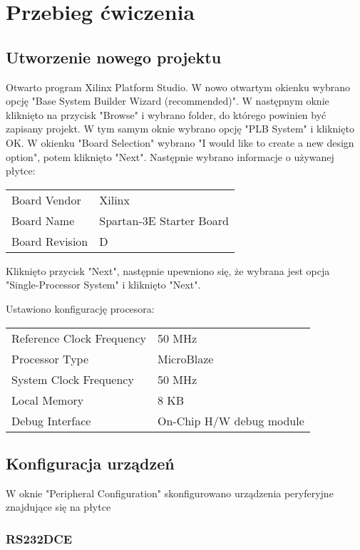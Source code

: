 \section{Przebieg ćwiczenia}
\subsection{Utworzenie nowego projektu}
Otwarto program Xilinx Platform Studio. W nowo otwartym okienku wybrano opcję "Base System
Builder Wizard (recommended)". W następnym oknie kliknięto na
przycisk "Browse" i wybrano folder, do którego powinien być zapisany projekt. W tym samym oknie
wybrano opcję "PLB System" i kliknięto OK.
W okienku "Board Selection" wybrano "I would like to create a new design option", potem kliknięto
"Next". Następnie wybrano informacje o używanej płytce:

\begin{center}
	\begin{tabular}{|l|l|}
		Board Vendor & Xilinx \\
		Board Name & Spartan-3E Starter Board \\
		Board Revision & D
	\end{tabular}
\end{center}
Kliknięto przycisk "Next", następnie upewniono się, że wybrana jest opcja "Single-Processor System"
i kliknięto "Next".

Ustawiono konfigurację procesora:

\begin{center}
	\begin{tabular}{|l|l|}
		Reference Clock Frequency & 50 MHz\\
		Processor Type			& MicroBlaze\\
		System Clock Frequency	& 50 MHz\\
		Local Memory			  & 8 KB\\
		Debug Interface		   & On-Chip H/W debug module\\
	\end{tabular}
\end{center}
\subsection{Konfiguracja urządzeń}

W oknie "Peripheral Configuration" skonfigurowano urządzenia peryferyjne znajdujące się na płytce

\subsubsection*{RS232\textunderscore DCE}

